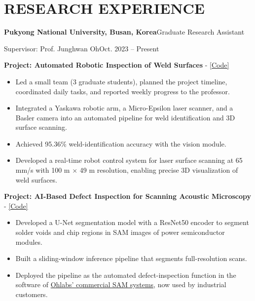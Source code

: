 \documentclass[a4paper,10pt]{extarticle}
\newcommand{\cventry}[2]{\noindent\textbf{#1}\hfill #2\par}
\newcommand{\cvline}[2]{\noindent #1\hfill #2\par}
\newenvironment{cvlist}{\begin{list}{}{%
  \setlength{\leftmargin}{0pt}\setlength{\itemindent}{0pt}%
  \setlength{\parsep}{0pt}\setlength{\itemsep}{4pt}\setlength{\topsep}{4pt}}}%
  {\end{list}}
\begin{document}
\section*{RESEARCH EXPERIENCE}
\begin{cvlist}
    \item
    \cventry{Pukyong National University, Busan, Korea}{Graduate Research Assistant}
    \cvline{Supervisor: Prof. Junghwan Oh}{Oct. 2023 -- Present}
    \begin{enumerate}[label={[\arabic*]}, leftmargin=*]
        \item \textbf{Project: Automated Robotic Inspection of Weld Surfaces} - \href{https://github.com/nhannt69/VIKO_UltraRobot}{[Code]}
        \begin{itemize}[leftmargin=*]
            \item Led a small team (3 graduate students), planned the project timeline, coordinated daily tasks, and reported weekly progress to the professor.
            \item Integrated a Yaskawa robotic arm, a Micro-Epsilon laser scanner, and a Basler camera into an automated pipeline for weld identification and 3D surface scanning.
            \item Achieved 95.36\% weld-identification accuracy with the vision module.
            \item Developed a real-time robot control system for laser surface scanning at 65\,mm/s with 100 \textmu m $\times$ 49 \textmu m resolution, enabling precise 3D visualization of weld surfaces.
        \end{itemize}
        \item \textbf{Project: AI-Based Defect Inspection for Scanning Acoustic Microscopy} - \href{https://github.com/nhannt69/SAM-Inspection}{[Code]}
        \begin{itemize}[leftmargin=*]
            \item Developed a U-Net segmentation model with a ResNet50 encoder to segment solder voids and chip regions in SAM images of power semiconductor modules.
            \item Built a sliding-window inference pipeline that segments full-resolution scans.
            \item Deployed the pipeline as the automated defect-inspection function in the software of \href{https://www.ohlabs.co.kr/company}{Ohlabs' commercial SAM systems}, now used by industrial customers.
        \end{itemize}

\end{enumerate}
\end{cvlist}
\end{document}
